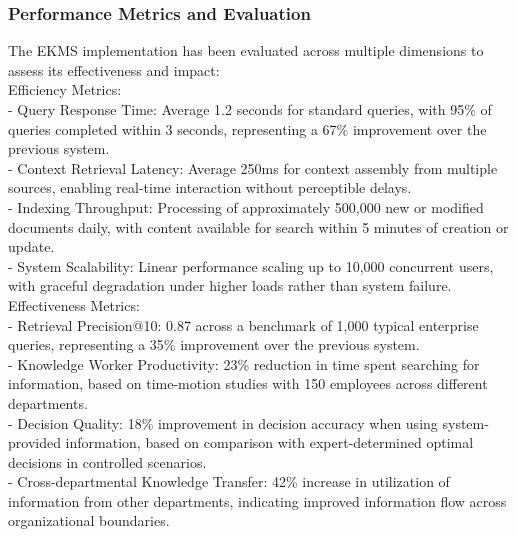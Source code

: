 \subsubsection{Performance Metrics and Evaluation}
The EKMS implementation has been evaluated across multiple dimensions to assess its effectiveness and impact:\\ \newline
Efficiency Metrics:\\ \newline
- Query Response Time: Average 1.2 seconds for standard queries, with 95\% of queries completed within 3 seconds, representing a 67\% improvement over the previous system.\\ \newline
- Context Retrieval Latency: Average 250ms for context assembly from multiple sources, enabling real-time interaction without perceptible delays.\\ \newline
- Indexing Throughput: Processing of approximately 500,000 new or modified documents daily, with content available for search within 5 minutes of creation or update.\\ \newline
- System Scalability: Linear performance scaling up to 10,000 concurrent users, with graceful degradation under higher loads rather than system failure.\\ \newline
Effectiveness Metrics:\\ \newline
- Retrieval Precision@10: 0.87 across a benchmark of 1,000 typical enterprise queries, representing a 35\% improvement over the previous system.\\ \newline
- Knowledge Worker Productivity: 23\% reduction in time spent searching for information, based on time-motion studies with 150 employees across different departments.\\ \newline
- Decision Quality: 18\% improvement in decision accuracy when using system-provided information, based on comparison with expert-determined optimal decisions in controlled scenarios.\\ \newline
- Cross-departmental Knowledge Transfer: 42\% increase in utilization of information from other departments, indicating improved information flow across organizational boundaries.\\ \newline
